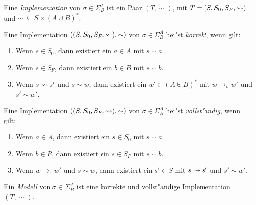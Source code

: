 \documentclass[12pt,a4paper]{article}
\begin{document}
\begin{definition}[Implementation]
  Eine \emph{Implementation} von $\sigma\in\Sigma^A_B$ ist ein Paar
  $(T,\sim)$, mit $T = (S,S_0,S_F,\rightsquigarrow)$ und $\sim\ \subseteq S \times (A \uplus B)^*$.
\end{definition}

\begin{definition}
  Eine Implementation $((S,S_0,S_F,\rightsquigarrow),\sim)$ von $\sigma \in \Sigma^A_B$ hei"st \emph{korrekt},
  wenn gilt:
  \begin{enumerate}
  \item Wenn $s \in S_0$, dann existiert ein $a \in A$ mit $s \sim a$.
  \item Wenn $s \in S_F$, dann existiert ein $b \in B$ mit $s \sim b$.
  \item Wenn $s \rightsquigarrow s'$ und $s \sim w$, dann existiert ein $w' \in (A \uplus B)^*$
    mit $w \to_\sigma w'$ und $s' \sim w'$.
  \end{enumerate}
\end{definition}

\begin{definition}
  Eine Implementation $((S,S_0,S_F,\rightsquigarrow),\sim)$ von $\sigma \in \Sigma^A_B$ hei"st \emph{vollst"andig},
  wenn gilt:
  \begin{enumerate}
  \item Wenn $a \in A$, dann existiert ein $s \in S_0$ mit $s \sim a$.
  \item Wenn $b \in B$, dann existiert ein $s \in S_F$ mit $s \sim b$.
  \item Wenn $w \to_\sigma w'$ und $s \sim w$, dann existiert ein $s' \in S$
    mit $s \rightsquigarrow s'$ und $s' \sim w'$.
  \end{enumerate}
\end{definition}

\begin{definition}[Modell]
  Ein \emph{Modell} von $\sigma \in \Sigma^A_B$ ist eine
  korrekte und vollst"andige Implementation $(T,\sim)$.
\end{definition}
\end{document}
